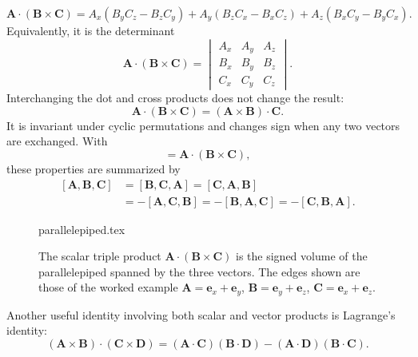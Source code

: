 \begin{equation}
\mathbf{A}\cdot(\mathbf{B}\times\mathbf{C})
= A_x(B_yC_z-B_zC_y)+A_y(B_zC_x-B_xC_z)+A_z(B_xC_y-B_yC_x).
\end{equation}
Equivalently, it is the determinant
\begin{equation}
\mathbf{A}\cdot(\mathbf{B}\times\mathbf{C})
=\begin{vmatrix}
A_x & A_y & A_z \\
B_x & B_y & B_z \\
C_x & C_y & C_z
\end{vmatrix}.
\end{equation}
Interchanging the dot and cross products does not change the result:
\begin{equation}
\mathbf{A}\cdot(\mathbf{B}\times\mathbf{C})
=(\mathbf{A}\times\mathbf{B})\cdot\mathbf{C}.
\end{equation}
It is invariant under cyclic permutations and changes sign when any two vectors are exchanged. With
\begin{equation}
[\mathbf{A},\mathbf{B},\mathbf{C}]
=\mathbf{A}\cdot(\mathbf{B}\times\mathbf{C}),
\end{equation}
these properties are summarized by
\begin{equation}
\begin{aligned}
[\mathbf{A},\mathbf{B},\mathbf{C}]
&=[\mathbf{B},\mathbf{C},\mathbf{A}]
=[\mathbf{C},\mathbf{A},\mathbf{B}] \\
&=-[\mathbf{A},\mathbf{C},\mathbf{B}]
=-[\mathbf{B},\mathbf{A},\mathbf{C}]
=-[\mathbf{C},\mathbf{B},\mathbf{A}].
\end{aligned}
\end{equation}

\begin{figure}[htb]
    \centering
    {parallelepiped.tex}
    \caption{The scalar triple product $\mathbf{A}\cdot(\mathbf{B}\times\mathbf{C})$ is the signed volume of the parallelepiped spanned by the three vectors. The edges shown are those of the worked example $\mathbf{A}=\mathbf{e}_x+\mathbf{e}_y$, $\mathbf{B}=\mathbf{e}_y+\mathbf{e}_z$, $\mathbf{C}=\mathbf{e}_x+\mathbf{e}_z$.}
    \label{fig:scalar_triple_product}
\end{figure}

    Another useful identity involving both scalar and vector products is Lagrange's identity:
    \begin{equation}
    (\mathbf{A}\times\mathbf{B})\cdot(\mathbf{C}\times\mathbf{D})
    =(\mathbf{A}\cdot\mathbf{C})(\mathbf{B}\cdot\mathbf{D})
    -(\mathbf{A}\cdot\mathbf{D})(\mathbf{B}\cdot\mathbf{C}).
    \end{equation}

